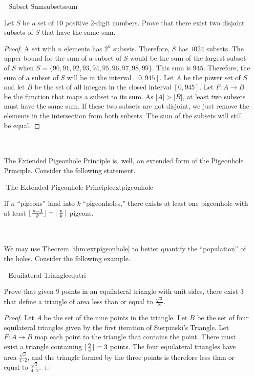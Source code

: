     \pagebreak
    \begin{example}{\Difficulty\,\Difficulty\,\Difficulty\,\,Subset Sum}{subsetssum}

        Let \(S\) be a set of \(10\) positive \(2\)-digit numbers. Prove that there exist two disjoint subsets of \(S\) that have the same sum. 
        \begin{proof}
            A set with \(n\) elements has \(2^n\) subsets. Therefore, \(S\) has \(1024\) subsets. The upper bound for the sum of a subset of \(S\) would be the sum of the largest subset of \(S\) when \(S=\{90,91,92,93,94,95,96,97,98,99\}\). This sum is \(945\). Therefore, the sum of a subset of \(S\) will be in the interval \([0,945]\). Let \(A\) be the power set of \(S\) and let \(B\) be the set of all integers in the closed interval \([0,945]\). Let \(F:A\to B\) be the function that maps a subset to its sum. As \(|A|>|B|\), at least two subsets must have the same sum. If these two subsets are not disjoint, we just remove the elements in the intersection from both subsets. The sum of the subsets will still be equal.
        \end{proof}

    \end{example}
    \vphantom
    \\
    \\
    The Extended Pigeonhole Principle is, well, an extended form of the Pigeonhole Principle. Consider the following statement.
    \begin{theorem}{\Stop\,\,The Extended Pigeonhole Principle}{extpigeonhole}
    
        If \(n\) ``pigeons'' land into \(k\) ``pigeonholes,'' there exists at least one pigeonhole with at least \(\lfloor\frac{n-1}{k}\rfloor=\lceil\frac{n}{k}\rceil\) pigeons.
    
    \end{theorem}
    \vphantom
    \\
    \\
    We may use Theorem \ref{thm:extpigeonhole} to better quantify the ``population'' of the holes. Consider the following example.
    \begin{example}{\Difficulty\,\Difficulty\,\Difficulty\,\,Equilateral Triangle}{equtri}
    
        Prove that given \(9\) points in an equilateral triangle with unit sides, there exist \(3\) that define a triangle of area less than or equal to \(\frac{\sqrt{3}}{8}\).
        \begin{proof}
            Let \(A\) be the set of the nine points in the triangle. Let \(B\) be the set of four equilateral triangles given by the first iteration of Sierpinski's Triangle. Let \(F:A\to B\) map each point to the triangle that contains the point. There must exist a triangle containing \(\lceil\frac{9}{4}\rceil=3\) points. The four equilateral triangles have area \(\frac{\sqrt{3}}{4\cdot2}\), and the triangle formed by the three points is therefore less than or equal to \(\frac{\sqrt{3}}{4\cdot2}\).
        \end{proof}
    
    \end{example}
